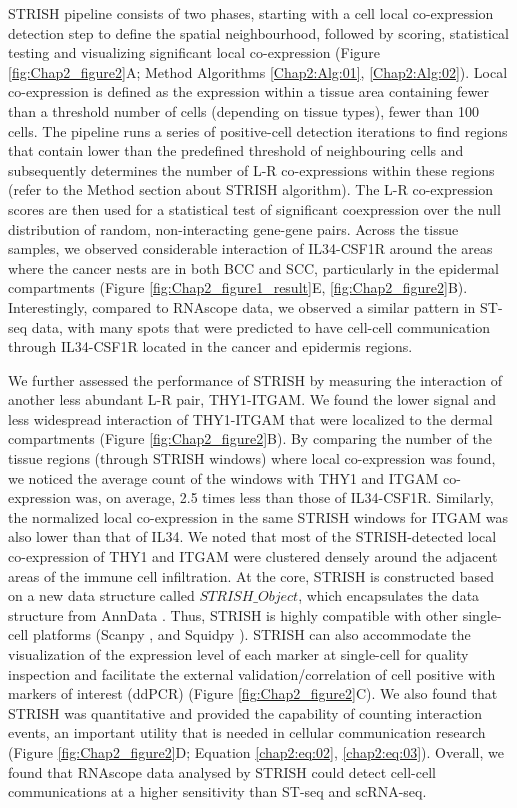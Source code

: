 STRISH pipeline consists of two phases, starting with a cell local co-expression detection step to define the spatial neighbourhood, followed by scoring, statistical testing and visualizing significant local co-expression (Figure \ref{fig:Chap2_figure2}A; Method Algorithms \ref{Chap2:Alg:01}, \ref{Chap2:Alg:02}). Local co-expression is defined as the expression within a tissue area containing fewer than a threshold number of cells (depending on tissue types), \ie fewer than 100 cells. The pipeline runs a series of positive-cell detection iterations to find regions that contain lower than the predefined threshold of neighbouring cells and subsequently determines the number of L-R co-expressions within these regions (refer to the Method section about STRISH algorithm). The L-R co-expression scores are then used for a statistical test of significant coexpression over the null distribution of random, non-interacting gene-gene pairs. Across the tissue samples, we observed considerable interaction of IL34-CSF1R around the areas where the cancer nests are in both BCC and SCC, particularly in the epidermal compartments (Figure \ref{fig:Chap2_figure1_result}E, \ref{fig:Chap2_figure2}B). Interestingly, compared to RNAscope data, we observed a similar pattern in ST-seq data, with many spots that were predicted to have cell-cell communication through IL34-CSF1R located in the cancer and epidermis regions.  

We further assessed the performance of STRISH by measuring the interaction of another less abundant L-R pair, THY1-ITGAM. We found the lower signal and less widespread interaction of THY1-ITGAM that were localized to the dermal compartments (Figure \ref{fig:Chap2_figure2}B). By comparing the number of the tissue regions (through STRISH windows) where local co-expression was found, we noticed the average count of the windows with THY1 and ITGAM co-expression was, on average, 2.5 times less than those of IL34-CSF1R. Similarly, the normalized local co-expression in the same STRISH windows for ITGAM was also lower than that of IL34. We noted that most of the STRISH-detected local co-expression of THY1 and ITGAM were clustered densely around the adjacent areas of the immune cell infiltration. At the core, STRISH is constructed based on a new data structure called $STRISH\_Object$, which encapsulates the data structure from AnnData \cite{wolf2018scanpy}. Thus, STRISH is highly compatible with other single-cell platforms (\ie Scanpy \cite{wolf2018scanpy}, and Squidpy \cite{palla2022squidpy}). STRISH can also accommodate the visualization of the expression level of each marker at single-cell for quality inspection and facilitate the external validation/correlation of cell positive with markers of interest (\ie ddPCR) (Figure \ref{fig:Chap2_figure2}C). We also found that STRISH was quantitative and provided the capability of counting interaction events, an important utility that is needed in cellular communication research (Figure \ref{fig:Chap2_figure2}D; Equation \ref{chap2:eq:02}, \ref{chap2:eq:03}). Overall, we found that RNAscope data analysed by STRISH could detect cell-cell communications at a higher sensitivity than ST-seq and scRNA-seq. 

